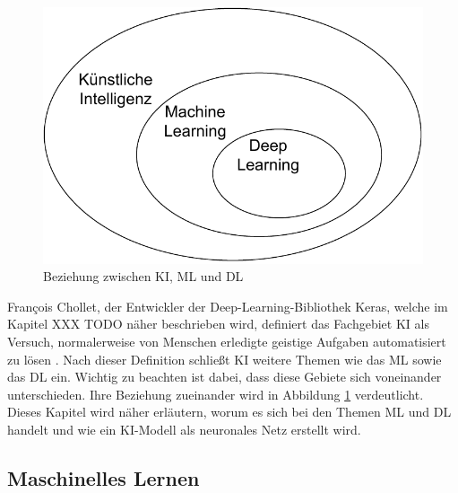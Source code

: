 \begin{figure}
    \includegraphics[width=\textwidth/2]{abbildungen/KI_ML_DL.pdf}
    \caption{Beziehung zwischen \ac{KI}, \ac{ML} und \ac{DL} \cite[vgl. S.22]{DL_PY}}
    \label{fig:KI_ML_DL}
\end{figure} 

François Chollet, der Entwickler der Deep-Learning-Bibliothek Keras, welche im Kapitel XXX TODO näher beschrieben wird, definiert
das Fachgebiet \ac{KI} als \glqq [den] Versuch, normalerweise von Menschen erledigte geistige Aufgaben automatisiert zu lösen\grqq{} \cite[S.22]{DL_PY}.
Nach dieser Definition schließt \ac{KI} weitere Themen wie das \ac{ML} sowie das \ac{DL} ein. Wichtig zu beachten ist dabei,
dass diese Gebiete sich voneinander unterschieden. Ihre Beziehung zueinander wird in Abbildung \ref*{fig:KI_ML_DL} verdeutlicht.\\

Dieses Kapitel wird näher erläutern, worum es sich bei den Themen \ac{ML} und \ac{DL} handelt und wie ein \ac{KI}-Modell als neuronales Netz erstellt wird.

\subsection{Maschinelles Lernen}

